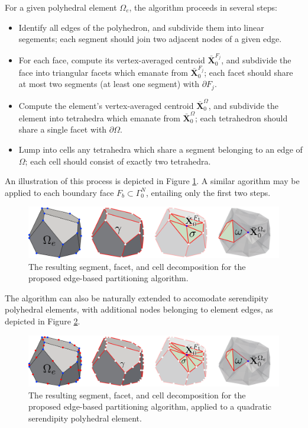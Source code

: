 	For a given polyhedral element $\Omega_e$, the algorithm proceeds in several steps:
	\begin{itemize}
		\item[1.)] Identify all edges of the polyhedron, and subdivide them into linear segements; each segment should join two adjacent nodes of a given edge.
		\item[2.)] For each face, compute its vertex-averaged centroid $\bar{\mathbf{X}}^{F_j}_0$, and subdivide the face into triangular facets which emanate from $\bar{\mathbf{X}}^{F_j}_0$; each facet should share at most two segments (at least one segment) with $\partial F_j$.
		\item[3a.)] Compute the element's vertex-averaged centroid $\bar{\mathbf{X}}^{\Omega}_0$, and subdivide the element into tetrahedra which emanate from $\bar{\mathbf{X}}^{\Omega}_0$; each tetrahedron should share a single facet with $\partial \Omega$.
		\item[3b.)] Lump into cells any tetrahedra which share a segment belonging to an edge of $\Omega$; each cell should consist of exactly two tetrahedra.
	\end{itemize}
	An illustration of this process is depicted in Figure \ref{fig:partitioning_algorithm}. A similar agorithm may be applied to each boundary face $F_b \subset \Gamma^N_0$, entailing only the first two steps. 
	\begin{figure} [!ht]
		\centering
		\includegraphics[width = 6.0in]{figures/partitioning_algorithm.pdf}
		\caption{The resulting segment, facet, and cell decomposition for the proposed edge-based partitioning algorithm.}
		\label{fig:partitioning_algorithm}
	\end{figure}
	
	The algorithm can also be naturally extended to accomodate serendipity polyhedral elements, with additional nodes belonging to element edges, as depicted in Figure \ref{fig:partitioning_algorithm_quadratic}.
	\begin{figure} [!ht]
		\centering
		\includegraphics[width = 6.0in]{figures/partitioning_algorithm_quadratic.pdf}
		\caption{The resulting segment, facet, and cell decomposition for the proposed edge-based partitioning algorithm, applied to a quadratic serendipity polyhedral element.}
		\label{fig:partitioning_algorithm_quadratic}
	\end{figure}


